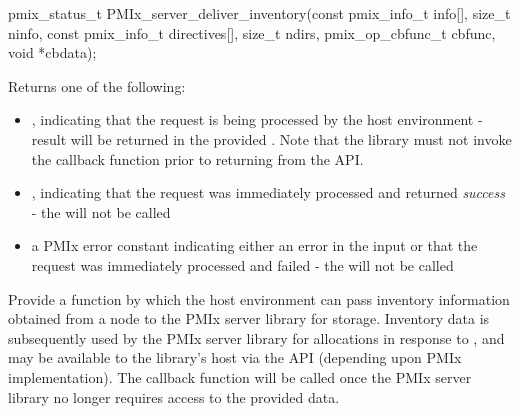 \cspecificstart
\begin{codepar}
pmix_status_t
PMIx_server_deliver_inventory(const pmix_info_t info[],
                              size_t ninfo,
                              const pmix_info_t directives[],
                              size_t ndirs,
                              pmix_op_cbfunc_t cbfunc,
                              void *cbdata);
\end{codepar}
\cspecificend

\begin{arglist}
\end{arglist}

Returns one of the following:

\begin{itemize}
    \item {}, indicating that the request is being processed by the host environment - result will be returned in the provided . Note that the library must not invoke the callback function prior to returning from the \ac{API}.
    \item {}, indicating that the request was immediately processed and returned \textit{success} - the  will not be called
    \item a PMIx error constant indicating either an error in the input or that the request was immediately processed and failed - the  will not be called
\end{itemize}


\descr

Provide a function by which the host environment can pass inventory information obtained from a node to the \ac{PMIx} server library for storage. Inventory data is subsequently used by the \ac{PMIx} server library for allocations in response to , and may be available to the library's host via the  \ac{API} (depending upon \ac{PMIx} implementation). The  callback function will be called once the \ac{PMIx} server library no longer requires access to the provided data.

